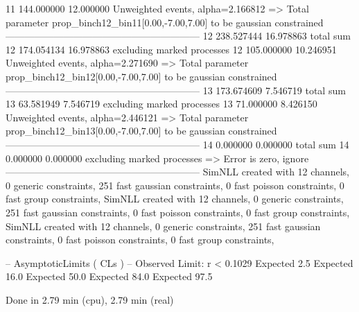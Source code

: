 11         144.000000      12.000000       Unweighted events, alpha=2.166812
  => Total parameter prop_binch12_bin11[0.00,-7.00,7.00] to be gaussian constrained
------------------------------------------------------------
12         238.527444      16.978863       total sum                     
12         174.054134      16.978863       excluding marked processes    
12         105.000000      10.246951       Unweighted events, alpha=2.271690
  => Total parameter prop_binch12_bin12[0.00,-7.00,7.00] to be gaussian constrained
------------------------------------------------------------
13         173.674609      7.546719        total sum                     
13         63.581949       7.546719        excluding marked processes    
13         71.000000       8.426150        Unweighted events, alpha=2.446121
  => Total parameter prop_binch12_bin13[0.00,-7.00,7.00] to be gaussian constrained
------------------------------------------------------------
14         0.000000        0.000000        total sum                     
14         0.000000        0.000000        excluding marked processes    
  => Error is zero, ignore      
------------------------------------------------------------
SimNLL created with 12 channels, 0 generic constraints, 251 fast gaussian constraints, 0 fast poisson constraints, 0 fast group constraints, 
SimNLL created with 12 channels, 0 generic constraints, 251 fast gaussian constraints, 0 fast poisson constraints, 0 fast group constraints, 
SimNLL created with 12 channels, 0 generic constraints, 251 fast gaussian constraints, 0 fast poisson constraints, 0 fast group constraints, 

 -- AsymptoticLimits ( CLs ) --
Observed Limit: r < 0.1029
Expected  2.5%
Expected 16.0%
Expected 50.0%
Expected 84.0%
Expected 97.5%

Done in 2.79 min (cpu), 2.79 min (real)
